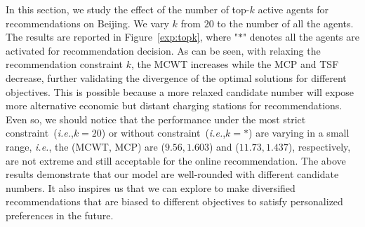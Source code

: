 \documentclass[sigconf]{acmart}
\newcommand{\beijing}{{\sc Beijing}\xspace}
\newcommand{\ie}{\emph{i.e.},\xspace}
\newcommand\figref[1]{Figure~\ref{#1}}
\begin{document}
In this section, we study the effect of the number of top-$k$ active agents for recommendations on \beijing. We vary $k$ from $20$ to the number of all the agents. The results are reported in \figref{exp:topk}, where "$*$" denotes all the agents are activated for recommendation decision. As can be seen, with relaxing the recommendation constraint $k$, the MCWT increases while the MCP and TSF decrease, further validating the divergence of the optimal solutions for different objectives.
This is possible because a more relaxed candidate number will expose more alternative economic but distant charging stations for recommendations. 
Even so, we should notice that the performance under the most strict constraint~(\ie $k=20$) or without constraint~(\ie $k=*$) are varying in a small range, \ie the (MCWT, MCP) are ($9.56, 1.603$) and ($11.73, 1.437$), respectively, are not extreme and still acceptable for the online recommendation. The above results demonstrate that our model are well-rounded with different candidate numbers.
It also inspires us that we can explore to make diversified recommendations that are biased to different objectives to satisfy personalized preferences in the future.
\end{document}
